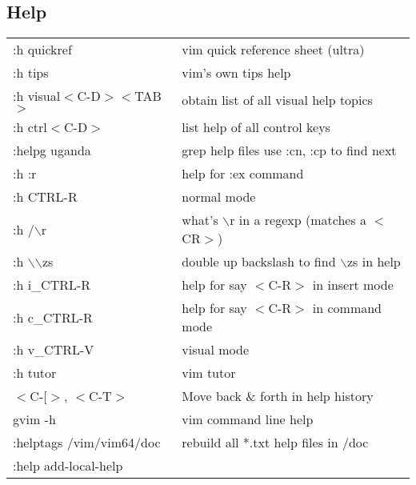 \subsection{Help}
\begin{center}
\begin{longtable}{l|l}
 :h quickref & vim quick reference sheet (ultra)\\
 :h tips & vim's own tips help\\
 :h visual$<$C-D$>$$<$TAB$>$ & obtain list of all visual help topics\\
 :h ctrl$<$C-D$>$ & list help of all control keys\\
 :helpg uganda & grep help files use :cn, :cp to find next\\
 :h :r & help for :ex command\\
 :h CTRL-R & normal mode\\
 :h /$\backslash$r & what's $\backslash$r in a regexp (matches a $<$CR$>$)\\
 :h $\backslash$$\backslash$zs & double up backslash to find $\backslash$zs in help\\
 :h i\_CTRL-R & help for say $<$C-R$>$ in insert mode\\
 :h c\_CTRL-R & help for say $<$C-R$>$ in command mode\\
 :h v\_CTRL-V & visual mode\\
 :h tutor & vim tutor\\
 $<$C-[$>$, $<$C-T$>$  & Move back \& forth in help history\\
 gvim -h & vim command line help\\
 :helptags /vim/vim64/doc & rebuild all *.txt help files in /doc\\
 :help add-local-help
\end{longtable}
\end{center}
